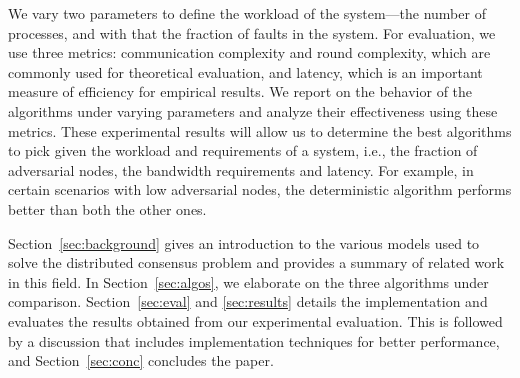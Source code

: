 We vary two parameters to define the workload of the system---the number of
processes, and with that the fraction of faults in the system.  For evaluation,
we use three metrics: communication complexity and round complexity, which are
commonly used for theoretical evaluation, and latency, which is an important
measure of efficiency for empirical results. We report on the behavior of the
algorithms under varying parameters and analyze their effectiveness using
these metrics.  These experimental results will allow us to determine the best
algorithms to pick given the workload and requirements of a system,
i.e., the fraction of adversarial nodes, the bandwidth requirements and
latency. For example, in certain scenarios with low adversarial nodes, the
deterministic algorithm performs better than both the other ones.

Section~\ref{sec:background} gives an introduction to the various models used
to solve the distributed consensus problem and provides a summary of related
work in this field. In Section~\ref{sec:algos}, we elaborate on the three
algorithms under comparison. Section~\ref{sec:eval} and \ref{sec:results}
details the implementation and evaluates the results obtained from our
experimental evaluation. This is followed by a discussion that includes
implementation techniques for better performance, and Section~\ref{sec:conc}
concludes the paper.
